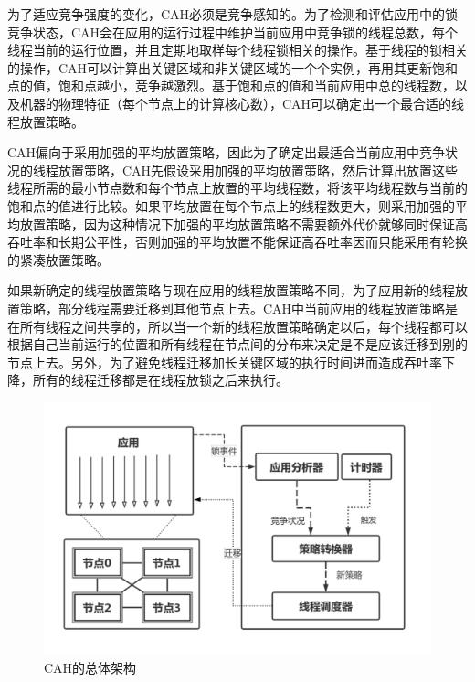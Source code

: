 为了适应竞争强度的变化，CAH必须是竞争感知的。为了检测和评估应用中的锁竞争状态，CAH会在应用的运行过程中维护当前应用中竞争锁的线程总数，每个线程当前的运行位置，并且定期地取样每个线程锁相关的操作。基于线程的锁相关的操作，CAH可以计算出关键区域和非关键区域的一个个实例，再用其更新饱和点的值，饱和点越小，竞争越激烈。基于饱和点的值和当前应用中总的线程数，以及机器的物理特征（每个节点上的计算核心数），CAH可以确定出一个最合适的线程放置策略。


CAH偏向于采用加强的平均放置策略，因此为了确定出最适合当前应用中竞争状况的线程放置策略，CAH先假设采用加强的平均放置策略，然后计算出放置这些线程所需的最小节点数和每个节点上放置的平均线程数，将该平均线程数与当前的饱和点的值进行比较。如果平均放置在每个节点上的线程数更大，则采用加强的平均放置策略，因为这种情况下加强的平均放置策略不需要额外代价就够同时保证高吞吐率和长期公平性，否则加强的平均放置不能保证高吞吐率因而只能采用有轮换的紧凑放置策略。

如果新确定的线程放置策略与现在应用的线程放置策略不同，为了应用新的线程放置策略，部分线程需要迁移到其他节点上去。CAH中当前应用的线程放置策略是在所有线程之间共享的，所以当一个新的线程放置策略确定以后，每个线程都可以根据自己当前运行的位置和所有线程在节点间的分布来决定是不是应该迁移到别的节点上去。另外，为了避免线程迁移加长关键区域的执行时间进而造成吞吐率下降，所有的线程迁移都是在线程放锁之后来执行。

\begin{figure}[t]
	\centering
	\includegraphics[width=5.6in]{figure/archi.pdf}
	\caption{CAH的总体架构}
	\label{Fig:archi}
\end{figure}

